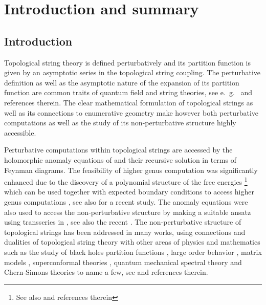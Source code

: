 \documentclass[a4paper,12pt,justification=centering]{article}
\numberwithin{equation}{section}
\theoremstyle{plain}%
\theoremstyle{definition}
\begin{document}
\section{Introduction and summary}
\subsection{Introduction}
Topological string theory is defined perturbatively and its partition function is given by an asymptotic series in the topological string coupling. The perturbative definition as well as the asymptotic nature of the expansion of its partition function are common traits of quantum field and string theories, see e.~g.~\cite{Marino:2012zq} and references therein. The clear mathematical formulation of topological strings as well as its connections to enumerative geometry make however both perturbative computations as well as the study of its non-perturbative structure highly accessible.

Perturbative computations within topological strings are accessed by the holomorphic anomaly equations of \cite{Bershadsky:1993cx} and their recursive solution in terms of Feynman diagrams. The feasibility of higher genus computation was significantly enhanced due to the discovery of a polynomial structure of the free energies \cite{Yamaguchi:2004bt,Alim:2007qj} \footnote{See also \cite{Alimlectures} and references therein } which can be used together with expected boundary conditions to access higher genus computations \cite{Huang:2006hq}, see also \cite{Alexandrov:2023zjb} for a recent study. The anomaly equations were also used to access the non-perturbative structure by making a suitable ansatz using transseries in \cite{Couso-Santamaria:2013kmu,Couso-Santamaria:2014iia}, see also the recent \cite{Gu:2023mgf}. The non-perturbative structure of topological strings has been addressed in many works, using connections and dualities of topological string theory with other areas of physics and mathematics such as the study of black holes partition functions \cite{Ooguri:2004zv}, large order behavior \cite{Marino:2006hs,Marino:2007te}, matrix models \cite{Eynard:2008he,Pasquetti:2009jg}, superconformal theories \cite{Lockhart:2012vp}, quantum mechanical spectral theory \cite{Grassi:2014zfa} and Chern-Simons theories \cite{Krefl:2015vna} to name a few, see \cite{Aniceto:2011nu,Marino:2012zq} and references therein.
\end{document}
